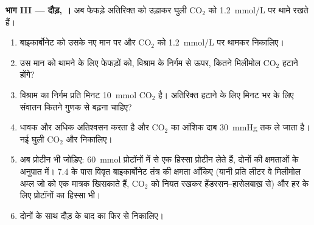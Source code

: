 \begin{problem}
\medskip
\noindent\textbf{भाग III --- दौड़, ।}
अब फेफड़े अतिरिक्त को उड़ाकर घुली $\mathrm{CO_2}$ को \qty{1.2}{mmol/L}
पर थामे रखते हैं।
\begin{enumerate}[resume]
  \item बाइकार्बोनेट को उसके नए मान पर और $\mathrm{CO_2}$ को
        \qty{1.2}{mmol/L} पर थामकर  निकालिए।
  \item उस मान को थामने के लिए फेफड़ों को, विश्राम के निर्गम से ऊपर,
        कितने मिलीमोल $\mathrm{CO_2}$ हटाने होंगे?
  \item विश्राम का निर्गम प्रति मिनट \qty{10}{mmol} $\mathrm{CO_2}$ है।
        अतिरिक्त हटाने के लिए मिनट भर के लिए संवातन कितने गुणक से बढ़ना
        चाहिए?
  \item धावक और अधिक अतिश्वसन करता है और $\mathrm{CO_2}$ का आंशिक दाब
        \qty{30}{mmHg} तक ले जाता है। नई घुली $\mathrm{CO_2}$ और 
        निकालिए।
  \item अब प्रोटीन  भी जोड़िए: \qty{60}{mmol} प्रोटॉनों में से एक
        हिस्सा प्रोटीन लेते हैं, दोनों  की क्षमताओं के अनुपात
        में।  7.4 के पास विवृत बाइकार्बोनेट तंत्र की क्षमता आँकिए
        (यानी प्रति लीटर वे मिलीमोल अम्ल जो  को एक मात्रक खिसकाते हैं,
        $\mathrm{CO_2}$ को नियत रखकर हेंडरसन--हासेलबाख़ से) और हर 
        के लिए प्रोटॉनों का हिस्सा भी।
  \item दोनों  के साथ दौड़ के बाद का  फिर से निकालिए।
\end{enumerate}


\end{problem}
